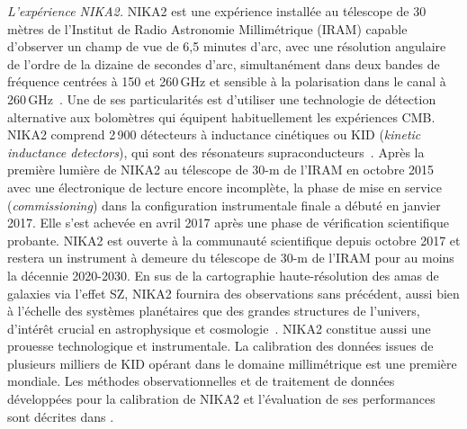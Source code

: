 \emph{L'expérience NIKA2.} NIKA2 est une expérience installée au
télescope de 30 mètres de l'Institut de Radio Astronomie Millimétrique
(IRAM) capable d'observer un champ de vue de 6,5 minutes d'arc, avec
une résolution angulaire de l'ordre de la dizaine de secondes d'arc,
simultanément dans deux bandes de fréquence centrées à 150 et
260\,GHz et sensible à la polarisation dans le canal à
260\,GHz~\citep{Adam2018, Perotto2019}. Une de ses particularités est
d'utiliser une technologie de détection alternative aux bolomètres qui
équipent habituellement les expériences CMB. NIKA2 comprend 2\,900
détecteurs à inductance cinétiques ou KID (\emph{kinetic inductance
detectors}), qui sont des résonateurs
supraconducteurs~\citep{Day2003, Doyle2008_LEKID, Roesch2012_LEKID}. Après la première lumière de NIKA2 au
télescope de 30-m de l'IRAM en octobre 2015 avec une électronique de
lecture encore incomplète, la phase de mise en service
(\emph{commissioning}) dans la configuration instrumentale finale a
débuté en janvier 2017. Elle s'est achevée en avril 2017 après une
phase de vérification scientifique probante. NIKA2 est ouverte à la
communauté scientifique depuis octobre 2017 et restera un instrument à
demeure du télescope de 30-m de l'IRAM pour au moins la décennie 2020-2030. En sus de la cartographie haute-résolution des amas
de galaxies via l'effet SZ, NIKA2 fournira des observations sans
précédent, aussi bien à l'échelle des systèmes planétaires que des
grandes structures de l'univers, d'intérêt crucial en astrophysique et
cosmologie~\citep[\emph{e.g.}][]{Rigby2018, Bracco2017, Bethermin2017_simu, Mancuso2016,
  Ruppin2019a}. NIKA2 constitue aussi une prouesse technologique et
instrumentale. La calibration des données issues de plusieurs milliers
de KID opérant dans le domaine millimétrique est une première
mondiale. Les méthodes observationnelles et de traitement de données
développées pour la calibration de NIKA2 et l'évaluation de ses
performances sont décrites dans \citet{Perotto2019}.\\


